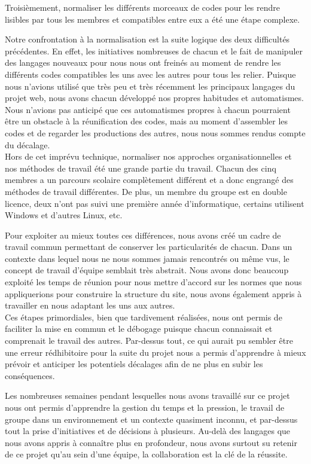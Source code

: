 \documentclass[12pt]{report}
\begin{document}
        \bigskip
        \par
        Troisièmement, normaliser les différents morceaux de codes pour les rendre lisibles par tous les membres et compatibles entre eux a été une étape complexe.
        \par
        Notre confrontation à la normalisation est la suite logique des deux difficultés précédentes. En effet, les initiatives nombreuses de chacun et le fait de manipuler des langages nouveaux pour nous nous ont freinés au moment de rendre les différents codes compatibles les uns avec les autres pour tous les relier. Puisque nous n’avions utilisé que très peu et très récemment les principaux langages du projet web, nous avons chacun développé nos propres habitudes et automatismes. Nous n’avions pas anticipé que ces automatismes propres à chacun pourraient être un obstacle à la réunification des codes, mais au moment d’assembler les codes et de regarder les productions des autres, nous nous sommes rendus compte du décalage.\\Hors de cet imprévu technique, normaliser nos approches organisationnelles et nos méthodes de travail été une grande partie du travail. Chacun des cinq membres a un parcours scolaire complètement différent et a donc engrangé des méthodes de travail différentes. De plus, un membre du groupe est en double licence, deux n’ont pas suivi une première année d’informatique, certains utilisent Windows et d’autres Linux, etc.
        \par
        Pour exploiter au mieux toutes ces différences, nous avons créé un cadre de travail commun permettant de conserver les particularités de chacun. Dans un contexte dans lequel nous ne nous sommes jamais rencontrés ou même vus, le concept de travail d’équipe semblait très abstrait. Nous avons donc beaucoup exploité les temps de réunion pour nous mettre d’accord sur les normes que nous appliquerions pour construire la structure du site, nous avons également appris à travailler en nous adaptant les uns aux autres.\\Ces étapes primordiales, bien que tardivement réalisées, nous ont permis de faciliter la mise en commun et le débogage puisque chacun connaissait et comprenait le travail des autres. Par-dessus tout, ce qui aurait pu sembler être une erreur rédhibitoire pour la suite du projet nous a permis d’apprendre à mieux prévoir et anticiper les potentiels décalages afin de ne plus en subir les conséquences.
        \bigskip
        \par
        Les nombreuses semaines pendant lesquelles nous avons travaillé sur ce projet nous ont permis d’apprendre la gestion du temps et la pression, le travail de groupe dans un environnement et un contexte quasiment inconnu, et par-dessus tout la prise d’initiatives et de décisions à plusieurs. Au-delà des langages que nous avons appris à connaître plus en profondeur, nous avons surtout su retenir de ce projet qu’au sein d’une équipe, la collaboration est la clé de la réussite.
\end{document}
